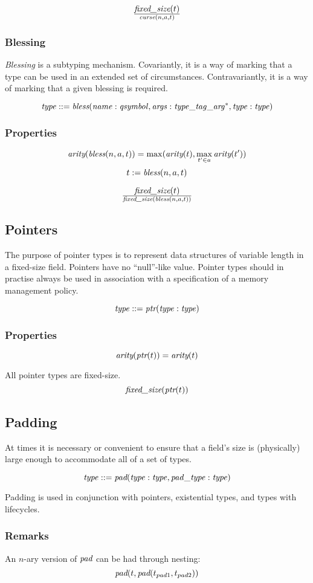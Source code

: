\documentclass[a4paper]{report}
\newcommand\arity{{\ensuremath\textit{arity}}}
\newcommand\fixedsize{{\ensuremath\textit{fixed\_size}}}
\newcommand\tyBless{{\ensuremath\textit{bless}}}
\newcommand\tyCurse{{\ensuremath\textit{curse}}}
\newcommand\tyPtr{{\ensuremath\textit{ptr}}}
\newcommand\tyPad{{\ensuremath\textit{pad}}}
\begin{document}
$$\fixedsize(t) \over \tyCurse(n,a,t)$$

\subsubsection{Blessing}
\emph{Blessing} is a subtyping mechanism.
Covariantly, it is a way of marking that a type can be used in an
extended set of circumstances.
Contravariantly, it is a way of marking that a given blessing is required.

$$
\it type ::= \tyBless(name : qsymbol, args : type\_tag\_arg^*, type : type)
$$

\subsubsection*{Properties}
$$
\arity(\tyBless(n,a,t)) = \max(\arity(t), \max_{t' \in a} \arity(t'))
$$
$$
t := \tyBless(n,a,t)
$$

$$\fixedsize(t) \over \fixedsize(\tyBless(n,a,t))$$

\subsection{Pointers}
The purpose of pointer types is to represent data structures of variable length
in a fixed-size field.
Pointers have no ``null''-like value. Pointer types should in practise
always be used in association with a specification of a memory management
policy.

$$\it type ::= \tyPtr(type : type)$$

\subsubsection*{Properties}
$$ \arity(\tyPtr(t)) = \arity(t)$$

All pointer types are fixed-size.
$$\fixedsize(\tyPtr(t))$$

\subsection{Padding}
At times it is necessary or convenient to ensure that a field's size is
(physically) large enough to accommodate all of a set of types.

$$\it type ::= \tyPad(type : type, pad\_type : type)$$

Padding is used in conjunction with pointers, existential types,
and types with lifecycles.

\subsubsection*{Remarks}
An $n$-ary version of $\tyPad$ can be had through nesting:
$$\tyPad(t, \tyPad(t_{pad1}, t_{pad2}))$$
\end{document}
